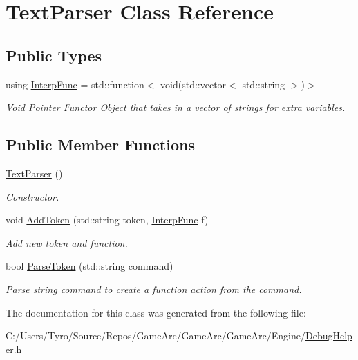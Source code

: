 \hypertarget{class_text_parser}{}\section{Text\+Parser Class Reference}
\label{class_text_parser}
\subsection*{Public Types}
\begin{DoxyCompactItemize}
\item 
\mbox{\label{class_text_parser_a9cd16418d2032d830f4ed2c2624e703d}} 
using \mbox{\hyperlink{class_text_parser_a9cd16418d2032d830f4ed2c2624e703d}{Interp\+Func}} = std\+::function$<$ void(std\+::vector$<$ std\+::string $>$)$>$
\begin{DoxyCompactList}\small\item\em Void Pointer Functor \mbox{\hyperlink{class_object}{Object}} that takes in a vector of strings for extra variables. \end{DoxyCompactList}\end{DoxyCompactItemize}
\subsection*{Public Member Functions}
\begin{DoxyCompactItemize}
\item 
\mbox{\label{class_text_parser_a4438162fe3717258692da1bad6531872}} 
\mbox{\hyperlink{class_text_parser_a4438162fe3717258692da1bad6531872}{Text\+Parser}} ()
\begin{DoxyCompactList}\small\item\em Constructor. \end{DoxyCompactList}\item 
\mbox{\label{class_text_parser_a894db87b2458e4ac91789b9f4f2e77b1}} 
void \mbox{\hyperlink{class_text_parser_a894db87b2458e4ac91789b9f4f2e77b1}{Add\+Token}} (std\+::string token, \mbox{\hyperlink{class_text_parser_a9cd16418d2032d830f4ed2c2624e703d}{Interp\+Func}} f)
\begin{DoxyCompactList}\small\item\em Add new token and function. \end{DoxyCompactList}\item 
\mbox{\label{class_text_parser_a17835c24de0a4e8f7ae71e0391013121}} 
bool \mbox{\hyperlink{class_text_parser_a17835c24de0a4e8f7ae71e0391013121}{Parse\+Token}} (std\+::string command)
\begin{DoxyCompactList}\small\item\em Parse string command to create a function action from the command. \end{DoxyCompactList}\end{DoxyCompactItemize}


The documentation for this class was generated from the following file\+:\begin{DoxyCompactItemize}
\item 
C\+:/\+Users/\+Tyro/\+Source/\+Repos/\+Game\+Arc/\+Game\+Arc/\+Game\+Arc/\+Engine/\mbox{\hyperlink{_debug_helper_8h}{Debug\+Helper.\+h}}\end{DoxyCompactItemize}
